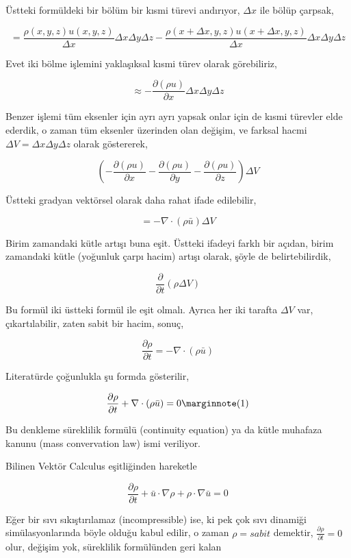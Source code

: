 \documentclass[12pt,fleqn]{article}\usepackage{../../common}
\begin{document}
Üstteki formüldeki bir bölüm bir kısmi türevi andırıyor, $\Delta x$ ile bölüp
çarpsak,

$$
= \frac{\rho(x,y,z)u(x,y,z)}{\Delta x}\Delta x \Delta y \Delta z -
\frac{\rho(x+\Delta x,y,z) u(x+\Delta x,y,z)}{\Delta x} \Delta x \Delta y \Delta z
$$

Evet iki bölme işlemini yaklaşıksal kısmi türev olarak görebiliriz,

$$
\approx -\frac{\partial (\rho u) }{\partial x} \Delta x \Delta y \Delta z
$$

Benzer işlemi tüm eksenler için ayrı ayrı yapsak onlar için de kısmi türevler
elde ederdik, o zaman tüm eksenler üzerinden olan değişim, ve farksal hacmi
$\Delta V = \Delta x \Delta y \Delta z$ olarak göstererek,

$$
\left(
-\frac{\partial (\rho u) }{\partial x} 
-\frac{\partial (\rho u) }{\partial y} 
-\frac{\partial (\rho u) }{\partial z} 
\right) \Delta V
$$

Üstteki gradyan vektörsel olarak daha rahat ifade edilebilir,

$$
= -\nabla \cdot (\rho \bar{u} ) \Delta V
$$

Birim zamandaki kütle artışı buna eşit. Üstteki ifadeyi farklı bir açıdan, birim
zamandaki kütle (yoğunluk çarpı hacim) artışı olarak, şöyle de belirtebilirdik,

$$
\frac{\partial }{\partial t} (\rho \Delta V) 
$$

Bu formül iki üstteki formül ile eşit olmalı. Ayrıca her iki tarafta $\Delta V$
var, çıkartılabilir, zaten sabit bir hacim, sonuç,

$$
\frac{\partial \rho}{\partial t}  = -\nabla \cdot (\rho \bar{u} )
$$

Literatürde çoğunlukla şu formda gösterilir,

$$
\frac{\partial \rho}{\partial t}  + \nabla \cdot (\rho \bar{u} ) = 0
\mlabel{1}
$$

Bu denkleme süreklilik formülü (continuity equation) ya da kütle muhafaza kanunu
(mass convervation law) ismi veriliyor.

Bilinen Vektör Calculus eşitliğinden hareketle

$$
\frac{\partial \rho}{\partial t}  +
\bar{u} \cdot \nabla \rho +
\rho \cdot \nabla \bar{u} = 0
$$

Eğer bir sıvı sıkıştırılamaz (incompressible) ise, ki pek çok sıvı dinamiği
simülasyonlarında böyle olduğu kabul edilir, o zaman $\rho = sabit$ demektir,
$\frac{\partial \rho}{\partial t} = 0 $ olur, değişim yok, süreklilik
formülünden geri kalan
\end{document}
